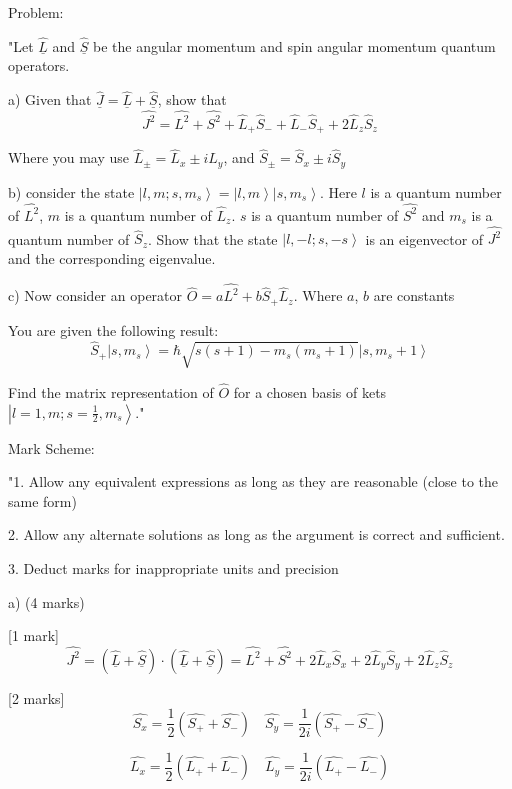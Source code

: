 Problem:

"Let \( \hat{\underline{L}} \) and \( \hat{\underline{S}} \) be the angular momentum and spin angular momentum quantum operators. 

a) Given that \( \hat{\underline{J}} = \hat{\underline{L}} + \hat{\underline{S}} \), show that 
\[ \hat{J^{2}} =  \hat{L^{2}} + \hat{S^{2}} + \hat{L}_{+}\hat{S}_{-} +  \hat{L}_{-}\hat{S}_{+} + 2\hat{L}_{z}\hat{S}_{z} \]

Where you may use  \( \hat{L}_{\pm} = \hat{L}_{x} \pm i\hat{L}_{y} \), and \( \hat{S}_{\pm} = \hat{S}_{x} \pm i\hat{S}_{y} \)

b) consider the state \( \left|l, m; s, m_{s} \right> = \left|l, m \right>\left|s, m_{s} \right> \). Here \( l \) is a quantum number of \( \hat{L^{2}} \), \( m \) is a quantum number of \( \hat{L}_{z} \). \( s \) is a quantum number of \( \hat{S^{2}} \) and \( m_{s} \) is a quantum number of \( \hat{S}_{z} \). Show that the state \( \left|l, -l; s, -s \right> \) is an eigenvector of \( \hat{J^{2}} \) and the corresponding eigenvalue. 

c) Now consider an operator \( \hat{O} = a\hat{L^{2}} + b\hat{S}_{+}\hat{L}_{z} \). Where \( a \), \( b \) are constants

You are given the following result:
\[ \hat{S}_{+} \left|s, m_{s} \right> = \hbar \sqrt{s(s+1) - m_{s}(m_{s}+1)} \left|s, m_{s}+1 \right> \]

Find the matrix representation of \( \hat{O} \) for a chosen basis of kets \( \left|l=1, m; s=\frac{1}{2}, m_{s} \right> \)."

Mark Scheme:

"1. Allow any equivalent expressions as long as they are reasonable (close to the same form)

2. Allow any alternate solutions as long as the argument is correct and sufficient. 

3. Deduct marks for inappropriate units and precision

a) (4 marks)

[1 mark] \[ \hat{J^{2}} = \left(\hat{\underline{L}} + \hat{\underline{S}} \right) \cdot \left(\hat{\underline{L}} + \hat{\underline{S}} \right) =  \hat{L^{2}} + \hat{S^{2}} + 2\hat{L}_{x}\hat{S}_{x} + 2\hat{L}_{y}\hat{S}_{y} + 2\hat{L}_{z}\hat{S}_{z} \]

[2 marks]  \[ \hat{S_{x}} = \frac{1}{2} (\hat{S_{+}} + \hat{S_{-}}) \quad \hat{S_{y}} = \frac{1}{2i} (\hat{S_{+}} - \hat{S_{-}}) \] 

\[ \hat{L_{x}} = \frac{1}{2} (\hat{L_{+}} + \hat{L_{-}}) \quad \hat{L_{y}} = \frac{1}{2i} (\hat{L_{+}} - \hat{L_{-}}) \]

